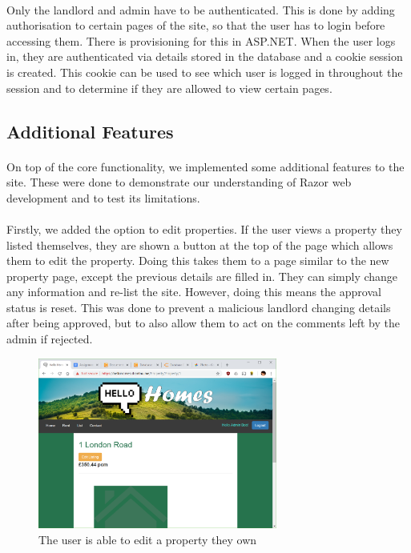 \documentclass{article}
\begin{document}
        \paragraph{}
            Only the landlord and admin have to be authenticated.
            This is done by adding authorisation to certain pages of the site, so that the user has to login before accessing them.
            There is provisioning for this in ASP.NET.
            When the user logs in, they are authenticated via details stored in the database and a cookie session is created.
            This cookie can be used to see which user is logged in throughout the session and to determine if they are allowed to view certain pages.

    \subsection{Additional Features}
        \paragraph{}
            On top of the core functionality, we implemented some additional features to the site.
            These were done to demonstrate our understanding of Razor web development and to test its limitations.

        \paragraph{}
            Firstly, we added the option to edit properties.
            If the user views a property they listed themselves, they are shown a button at the top of the page which allows them to edit the property.
            Doing this takes them to a page similar to the new property page, except the previous details are filled in.
            They can simply change any information and re-list the site.
            However, doing this means the approval status is reset.
            This was done to prevent a malicious landlord changing details after being approved, but to also allow them to act on the comments left by the admin if rejected.

            \begin{figure}[!htb]
                \centering
                \includegraphics[width=0.7\textwidth]{figures/edit_properties.png}
                \caption[Edit Properties]{The user is able to edit a property they own}
            \end{figure}
\end{document}
